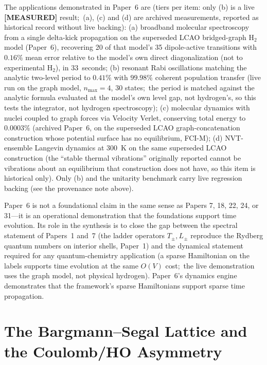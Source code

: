 \documentclass[aps,pra,twocolumn,superscriptaddress,longbibliography]{revtex4-2}
\newcommand{\gvc}[2]{#2}
\begin{document}
The applications demonstrated in Paper~6 are (tiers per item: only (b) is a
live \textbf{[MEASURED]} result;\ (a), (c) and (d) are archived
measurements, reported as historical record without live backing): (a) broadband molecular
spectroscopy from a single delta-kick propagation on the superseded
LCAO bridged-graph H$_2$ model (Paper~6), recovering 20 of that
model's 35 dipole-active transitions with $0.16\%$ mean error
relative to the model's own direct diagonalization (not to
experimental H$_2$), in 33~seconds; (b) resonant Rabi oscillations matching the
analytic two-level period to $0.41\%$ with
$99.98\%$ coherent population transfer (live run on the graph model,
$n_{\max} = 4$, 30 states;\ the period is matched against the analytic
formula evaluated at the model's own level gap, not hydrogen's, so this
tests the integrator, not hydrogen spectroscopy); (c) molecular
dynamics with nuclei coupled to graph forces via Velocity Verlet,
conserving total energy to $0.0003\%$ (archived Paper~6, on the
superseded LCAO graph-concatenation construction whose potential
surface has no equilibrium, FCI-M); (d) NVT-ensemble Langevin dynamics at
300~K on the same superseded LCAO construction (the ``stable thermal
vibrations'' originally reported cannot be vibrations about an
equilibrium that construction does not have, so this item is historical
only).  Only (b) and the unitarity benchmark
carry live regression backing (see the provenance note above).

Paper~6 is not a foundational claim in the same sense as Papers 7, 18,
22, 24, or 31---it is an operational demonstration that the
foundations support time evolution.  Its role in the synthesis is to
close the gap between the spectral statement of Papers~1 and~7 (\gvc{p1-ladder-exact}{the
ladder operators $T_\pm, L_\pm$ reproduce the Rydberg quantum numbers on
interior shells, Paper~1}) and the dynamical statement
required for any quantum-chemistry application (a sparse Hamiltonian on
the labels supports time evolution at the same $O(V)$ cost;\ the live
demonstration uses the graph model, not physical hydrogen).  Paper~6's
dynamics engine demonstrates that the framework's sparse Hamiltonians
support sparse time propagation.

\section{The Bargmann--Segal Lattice and the Coulomb/HO Asymmetry}
\label{sec:bs}
\end{document}
